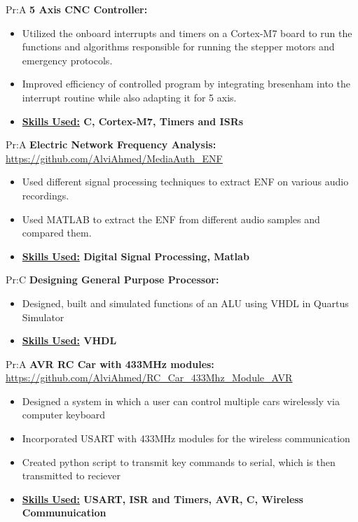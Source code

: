   
Pr:A
\vspace{\spaces}
\textbf{5 Axis CNC Controller: } 
\begin{itemize}[noitemsep,nolistsep]
\item Utilized the onboard interrupts and timers on a Cortex-M7 board to run the functions and algorithms responsible for running the stepper motors and emergency protocols.
\item Improved efficiency of controlled program by integrating bresenham into the interrupt routine while also adapting it for 5 axis.
\item \textbf{ \underline{Skills Used:} C, Cortex-M7, Timers and ISRs}
\end{itemize}


Pr:A
\vspace{\spaces}
\textbf{Electric Network Frequency Analysis: }
\underline{\url{https://github.com/AlviAhmed/MediaAuth_ENF}}
\begin{itemize}[noitemsep,nolistsep]
\item Used different signal processing techniques to extract ENF on various audio recordings.
\item Used MATLAB to extract the ENF from different audio samples and compared them.
\item \textbf{\underline{Skills Used:} Digital Signal Processing, Matlab}
\end{itemize}


Pr:C
\vspace{\spaces}
\textbf{Designing General Purpose Processor: } 
\begin{itemize}[noitemsep,nolistsep]
\item Designed, built and simulated functions of an ALU using VHDL in Quartus Simulator
\item \textbf{ \underline{Skills Used:} VHDL}
\end{itemize}


Pr:A
\vspace{\spaces}
\textbf{AVR RC Car with 433MHz modules: }
\underline{\url{https://github.com/AlviAhmed/RC_Car_433Mhz_Module_AVR}}
\begin{itemize}[noitemsep,nolistsep]
\item Designed a system in which a user can control multiple cars wirelessly
  via computer keyboard
\item Incorporated USART with 433MHz modules for the wireless communication
\item Created python script to transmit key commands to serial, which is then transmitted to reciever
\item \textbf{\underline{Skills Used:} USART, ISR and Timers, AVR, C, Wireless Communuication }
\end{itemize}


